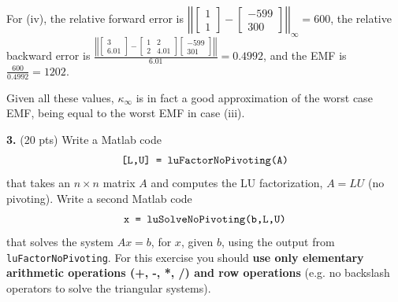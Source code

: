 \documentclass[10pt,letterpaper]{article}
\begin{document}
\begin{enumerate}
For (iv), the relative forward error is $\left|\left| \begin{bmatrix}
1 \\
1 
\end{bmatrix} - \begin{bmatrix}
-599 \\
300 
\end{bmatrix} \right|\right|_{\infty} = 600$, the relative backward error is $\frac{\left|\left| \begin{bmatrix}
3 \\
6.01 
\end{bmatrix} - \begin{bmatrix}
1 & 2 \\
2 & 4.01 
\end{bmatrix}\begin{bmatrix}
-599 \\
301 
\end{bmatrix} \right|\right|}{6.01} = 0.4992$, and the EMF is $\frac{600}{0.4992} = 1202$. 

Given all these values, $\kappa_{\infty}$ is in fact a good approximation of the worst case EMF, being equal to the worst EMF in case (iii). 
\color{black}

\end{enumerate}

\noindent\textbf{3. }(20 pts) Write a Matlab code
$$\text{{\tt[L,U] = luFactorNoPivoting(A)}}$$
that takes an $n \times n$ matrix $A$ and computes the LU factorization, $A = LU$ (no pivoting). Write a second Matlab code
$$\text{{\tt x = luSolveNoPivoting(b,L,U)}}$$
that solves the system $Ax = b$, for $x$, given $b$, using the output from {\tt luFactorNoPivoting}. For this exercise you should \textbf{use only elementary arithmetic operations (+, -, *, /) and row operations }(e.g. no backslash operators to solve the triangular systems). 
\end{document}
